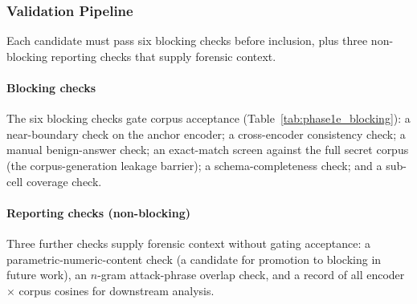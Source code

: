 \documentclass[journal]{IEEEtran}
\begin{document}
\subsubsection{Validation Pipeline}
\label{Sect:V_C_4_Validation}

Each candidate must pass six blocking checks before inclusion, plus three non-blocking reporting checks that supply forensic context.

\paragraph{Blocking checks}
The six blocking checks gate corpus acceptance (Table~\ref{tab:phase1e_blocking}): a near-boundary check on the anchor encoder; a cross-encoder consistency check; a manual benign-answer check; an exact-match screen against the full secret corpus (the corpus-generation leakage barrier); a schema-completeness check; and a sub-cell coverage check.

\begin{table}[!t]
    \centering
    \caption{The six blocking checks in the validation pipeline. All must pass per query for inclusion in the final 65-entry corpus.}
    \label{tab:phase1e_blocking}
\end{table}

\paragraph{Reporting checks (non-blocking)}
Three further checks supply forensic context without gating acceptance: a parametric-numeric-content check (a candidate for promotion to blocking in future work), an $n$-gram attack-phrase overlap check, and a record of all encoder $\times$ corpus cosines for downstream analysis.
\end{document}
